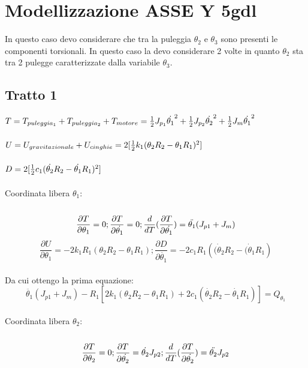 \documentclass{article}
\begin{document}
\section{Modellizzazione ASSE Y 5gdl}
In questo caso devo considerare che tra la puleggia $\theta_2$ e $\theta_3$ sono presenti le componenti torsionali. In questo caso la devo considerare 2 volte in quanto $\theta_2$ sta tra 2 pulegge caratterizzate dalla variabile $\theta_3$.
\subsection{Tratto 1}
$T = T_{puleggia_1} + T_{puleggia_2}+ T_{motore}
= {1 \over 2}J_{p_1}\dot{\theta_{1}}^{2}+ {1 \over 2}J_{p_2}\dot{\theta_{2}}^{2} + {1 \over 2}J_{m}\dot{\theta_{1}}^{2}$
\\
\\
$U = U_{gravitazionale} + U_{cinghie}
=  2[ {1 \over 2}k _{1}(\theta_{2}R_{2}-\theta_{1}R_{1})^{2} ]$
\\
\\
$D = 2[ {1 \over 2}c _{1}(\dot{\theta_{2}} R_{2}-\dot{\theta_{1}}R_{1})^{2} ]$
\\
\\
Coordinata libera $\theta_{1}$:
\\
\\

\begin{equation*}
{ \partial T \over \partial \theta_{1}} = 0 ; { \partial T \over \partial   \dot{\theta_{1}} } = 0;  \frac{d}{dT}(\frac{\partial T}{\partial \dot{\theta_{1}}})  = \ddot{\theta_{1}}(J_{p1} + J_{m})
\end{equation*}
\begin{equation*}
\frac{\partial U}{\partial \theta_{1}} = -2k_{1}R_{1}(\theta_{2}R_{2} - \theta_{1}R_{1});
\frac{\partial D}{\partial \dot{\theta_{1}}} = -2c_{1}R_{1}(\dot{(\theta_{2}}R_{2} - \dot{(\theta_{1}}R_{1})
\end{equation*}
\\
Da cui ottengo la prima equazione: 
\\
\begin{equation*}
 \ddot{\theta_{1}}(J_{p1}+J_{m}) - R_{1}[2k_{1}(\theta_{2}R_{2}-\theta_{1}R_{1})+ 2c_{1}(\dot{\theta_{2}}R_{2}-\dot{\theta_{1}}R_{1})] = Q_{\theta_1}
\end{equation*}
\\
Coordinata libera $\theta_{2}$:
\\
\\
\begin{equation*}
{ \partial T \over \partial \theta_{2}} = 0 ; { \partial T \over \partial   \dot{\theta_{2}} } = \dot{\theta_{2}}J_{p2};  \frac{d}{dT}(\frac{\partial T}{\partial \dot{\theta_{2}}})  = \ddot{\theta_{2}}J_{p2}
\end{equation*}
\end{document}
